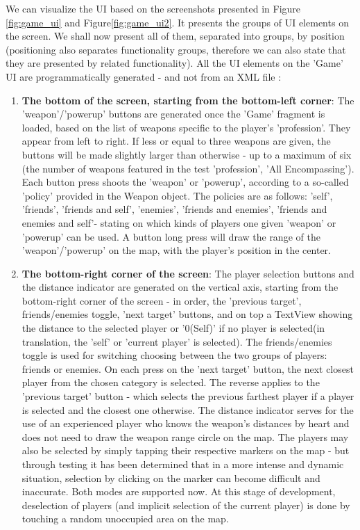 We can visualize the UI based on the screenshots presented in Figure
\ref{fig:game_ui} and Figure\ref{fig:game_ui2}. It presents the groups of UI
elements on the screen.
We shall now present all of them, separated into groups, by position
(positioning also separates functionality groups, therefore we can also state
that they are presented by related functionality). All the UI elements on the
'Game' UI are programmatically generated - and not from an XML file  :
\begin{enumerate}
  \item\textbf{The bottom of the screen, starting from the bottom-left corner}:
  The 'weapon'/'powerup' buttons are generated once the 'Game' fragment is loaded,
  based on the list of weapons specific to the player's 'profession'. They
  appear from left to right. If less or equal to three weapons are given, the
  buttons will be made slightly larger than otherwise - up to a maximum of six
  (the number of weapons featured in the test 'profession', 'All Encompassing').
  Each button press shoots the 'weapon' or 'powerup', according to a so-called
  'policy' provided in the Weapon object. The policies are as follows: 'self',
  'friends', 'friends and self', 'enemies', 'friends and enemies', 'friends and
  enemies and self'- stating on which kinds of players one given 'weapon' or
  'powerup' can be used. A button long press will draw the range of the
  'weapon'/'powerup' on the map, with the player's position in the center.
  
  \item\textbf{The bottom-right corner of the screen}: The player selection
  buttons and the distance indicator are generated on the vertical axis, starting from the
  bottom-right corner of the screen - in order, the 'previous target',
  friends/enemies toggle, 'next target' buttons, and on top a TextView showing
  the distance to the selected player or '0(Self)' if no player is selected(in
  translation, the 'self' or 'current player' is selected). The friends/enemies
  toggle is used for switching choosing between the two groups of players:
  friends or enemies. On each press on the 'next target' button,
  the next closest player from the chosen category is selected. The reverse
  applies to the 'previous target' button - which selects the previous farthest
  player if a player is selected and the closest one otherwise. The distance
  indicator serves for the use of an experienced player who knows the weapon's
  distances by heart and does not need to draw the weapon range circle on the
  map. The players may also be selected by simply tapping their respective
  markers on the map - but through testing it has been determined that in a more
  intense and dynamic situation, selection by clicking on the marker can become
  difficult and inaccurate. Both modes are supported now. At this stage of
  development, deselection of players (and implicit selection of the current
  player) is done by touching a random unoccupied area on the map.
  

\end{enumerate}
